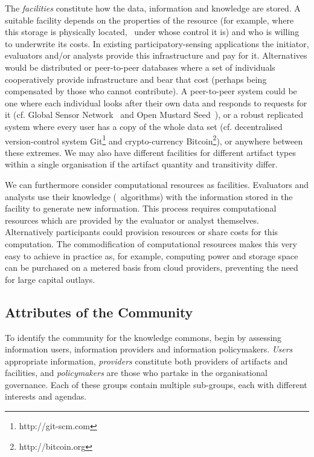 The \emph{facilities} constitute how the data, information and knowledge are
stored. A suitable facility depends on the properties of the resource (for
example, where this storage is physically located, \ie\ under whose control it
is) and who is willing to underwrite its costs.  In existing 
participatory-sensing applications the initiator, evaluators and/or analysts provide this
infrastructure and pay for it. Alternatives would be distributed or peer-to-peer 
databases where a set of individuals cooperatively provide infrastructure
and bear that cost (perhaps being compensated by those who cannot contribute).
A peer-to-peer system could be one where each individual looks after their own
data and responds to requests for it (cf. Global Sensor
Network~\citep{Aberer2006} and Open Mustard Seed~\citep{Hardjono2014}), or a
robust replicated system where every user has a copy of the whole data set
(cf. decentralised version-control system Git\footnote{http://git-scm.com} and
crypto-currency Bitcoin\footnote{http://bitcoin.org}), or anywhere between
these extremes.  We may also have different facilities for different artifact
types within a single organisation if the artifact quantity and transitivity
differ.

We can furthermore consider computational resources as facilities. Evaluators
and analysts use their knowledge (\ie\ algorithms) with the information stored
in the facility to generate new information. This process requires
computational resources which are provided by the evaluator or analyst
themselves. Alternatively participants could provision resources or share
costs for this computation. The commodification of computational resources
makes this very easy to achieve in practice as, for example, computing power
and storage space can be purchased on a metered basis from cloud providers,
preventing the need for large capital outlays.

\subsection{Attributes of the Community}

To identify the community for the knowledge commons,  begin by assessing information users, information providers and information policymakers. 
\emph{Users} appropriate information, \emph{providers} constitute both providers of artifacts and facilities, and \emph{policymakers} are those who partake in the organisational governance. 
Each of these groups contain multiple sub-groups, each with different interests and agendas.

